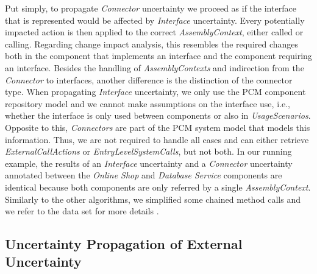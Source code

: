 Put simply, to propagate \emph{Connector} uncertainty we proceed as if the interface that is represented would be affected by \emph{Interface} uncertainty.
Every potentially impacted action is then applied to the correct \emph{AssemblyContext}, either called or calling.
Regarding change impact analysis, this resembles the required changes both in the component that implements an interface and the component requiring an interface.
Besides the handling of \emph{AssemblyContexts} and indirection from the \emph{Connector} to interfaces, another difference is the distinction of the connector type.
When propagating \emph{Interface} uncertainty, we only use the \ac{PCM} component repository model and we cannot make assumptions on the interface use, i.e., whether the interface is only used between components or also in \emph{UsageScenarios}.
Opposite to this, \emph{Connectors} are part of the \ac{PCM} system model that models this information.
Thus, we are not required to handle all cases and can either retrieve \emph{ExternalCallActions} or \emph{EntryLevelSystemCalls}, but not both.
In our running example, the results of an \emph{Interface} uncertainty and a \emph{Connector} uncertainty annotated between the \emph{Online Shop} and \emph{Database Service} components are identical because both components are only referred by a single \emph{AssemblyContext}.
Similarly to the other algorithms, we simplified some chained method calls and we refer to the data set for more details \cite{dataset}.


\subsection{Uncertainty Propagation of External Uncertainty}


